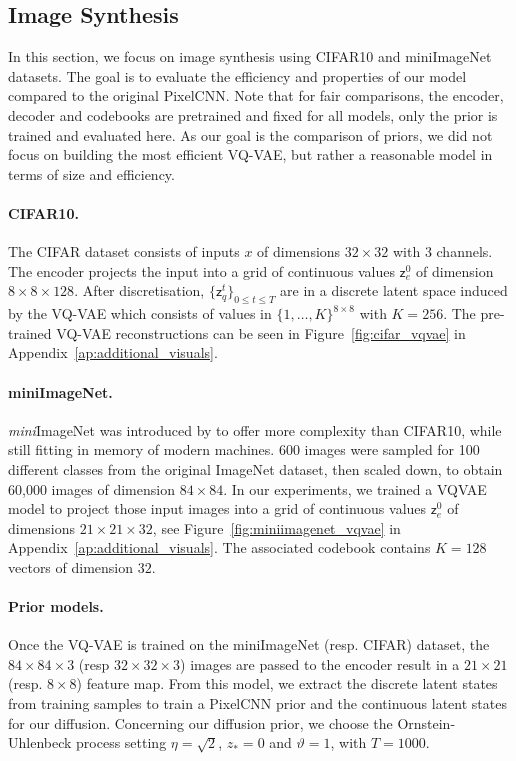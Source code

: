 \documentclass{article}
\theoremstyle{plain}
\theoremstyle{definition}
\theoremstyle{remark}
\newcommand{\latentcont}{\mathsf{z}_e}
\newcommand{\latentdis}{\mathsf{z}_q}
\begin{document}
\subsection{Image Synthesis}
In this section, we focus on image synthesis using CIFAR10 and miniImageNet datasets. The goal is to evaluate the efficiency and properties of our model compared to the original PixelCNN. Note that for fair comparisons, the encoder, decoder and codebooks are pretrained and fixed for all models, only the prior is trained and evaluated here. As our goal is the comparison of priors, we did not focus on building the most efficient VQ-VAE, but rather a reasonable model in terms of size and efficiency.

\paragraph{CIFAR10. }
 The CIFAR dataset consists of inputs $x$ of dimensions $32 \times 32$ with 3 channels. The encoder projects the input into a grid of continuous values $\latentcont^0$ of dimension $8 \times 8 \times 128$. After discretisation, $\{\latentdis^t\}_{0\leqslant t\leqslant T}$ are in a discrete latent space induced by the VQ-VAE which consists of values in $\{1,\ldots,K\}^{8 \times 8}$ with $K=256$. The pre-trained VQ-VAE reconstructions can be seen in Figure~\ref{fig:cifar_vqvae} in Appendix~\ref{ap:additional_visuals}.

\paragraph{miniImageNet. }
\textit{mini}ImageNet was introduced by \cite{Vinyals2016MatchingNF} to offer more complexity than CIFAR10, while still fitting in memory of modern machines.
600 images were sampled for 100 different classes from the original ImageNet dataset, then scaled down, to obtain 60,000 images of dimension $84 \times 84$.
In our experiments, we trained a VQVAE model to project those input images into a grid of continuous values $\latentcont^0$ of dimensions $21 \times 21 \times 32$, see Figure~\ref{fig:miniimagenet_vqvae} in Appendix~\ref{ap:additional_visuals}.
The associated codebook contains $K=128$ vectors of dimension $32$. 

\paragraph{Prior models. }
Once the VQ-VAE is trained on the miniImageNet (resp. CIFAR) dataset, the $84\times 84 \times 3$ (resp $32\times 32 \times 3$) images are passed to the encoder result in a $21 \times 21$ (resp. $8 \times 8$) feature map. From this model, we extract the discrete latent states from training samples to train a PixelCNN prior and the continuous latent states for our diffusion.
Concerning our diffusion prior, we choose the Ornstein-Uhlenbeck process setting $\eta = \sqrt{2}$, $z_*=0$ and $\vartheta = 1$, with $T=1000$. 
\end{document}
